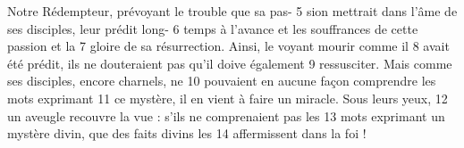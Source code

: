 Notre Rédempteur, prévoyant le trouble que sa pas-	 
5	 	sion mettrait dans l'âme de ses disciples, leur prédit long-	 
6	 	temps à l'avance et les souffrances de cette passion et la	 
7	 	gloire de sa résurrection. Ainsi, le voyant mourir comme il	 
8	 	avait été prédit, ils ne douteraient pas qu'il doive également	 
9	 	ressusciter. Mais comme ses disciples, encore charnels, ne	 
10	 	pouvaient en aucune façon comprendre les mots exprimant	 
11	 	ce mystère, il en vient à faire un miracle. Sous leurs yeux,	 
12	 	un aveugle recouvre la vue : s'ils ne comprenaient pas les	 
13	 	mots exprimant un mystère divin, que des faits divins les	 
14	 	affermissent dans la foi !